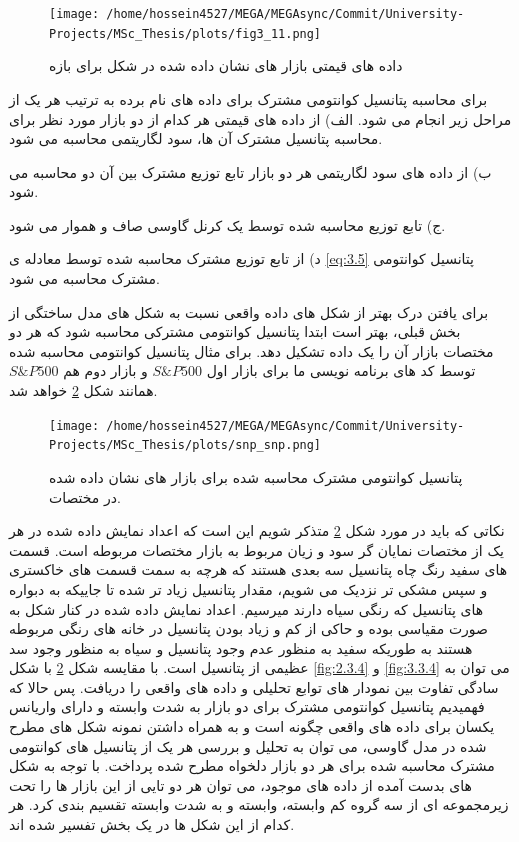 \documentclass[a4paper,titlepage,12pt,fleqn,oneside]{report}
\begin{document}
	\begin{figure}[ptb]
		\centering
		\texttt{[image: /home/hossein4527/MEGA/MEGAsync/Commit/University-Projects/MSc\_Thesis/plots/fig3\_11.png]}
		\caption{داده های قیمتی بازار های نشان داده شده در شکل برای بازه}
		\label{fig:11}
	\end{figure}
	برای محاسبه پتانسیل کوانتومی مشترک برای داده های نام برده به ترتیب هر یک از مراحل زیر انجام می شود. 
	الف) از داده های قیمتی هر کدام از دو بازار مورد نظر برای محاسبه پتانسیل مشترک آن ها، سود لگاریتمی محاسبه می شود.
	
	ب) از داده های سود لگاریتمی هر دو بازار تابع توزیع مشترک بین آن دو محاسبه می شود. 
	
	ج) تابع توزیع محاسبه شده توسط یک کرنل گاوسی صاف و هموار می شود.
	
	د) از تابع توزیع مشترک محاسبه شده توسط معادله ی 
	\ref{eq:3.5}
	پتانسیل کوانتومی مشترک محاسبه می شود. 
	
	برای یافتن درک بهتر از شکل های داده واقعی نسبت به شکل های مدل ساختگی از بخش قبلی، بهتر است ابتدا پتانسیل کوانتومی مشترکی محاسبه شود که هر دو مختصات بازار آن را یک داده تشکیل دهد. برای مثال پتانسیل کوانتومی محاسبه شده توسط کد های برنامه نویسی ما برای بازار اول
	$S\&P500$
	و بازار دوم هم
	$S\&P500$
	همانند شکل 
	\ref{fig:12}
	خواهد شد.
	\begin{figure}[ptb]
		\centering
		\texttt{[image: /home/hossein4527/MEGA/MEGAsync/Commit/University-Projects/MSc\_Thesis/plots/snp\_snp.png]}
		\caption{پتانسیل کوانتومی مشترک محاسبه شده برای بازار های نشان داده شده در مختصات.}
		\label{fig:12}
	\end{figure}
	نکاتی که باید در مورد شکل 
	\ref{fig:12}
	متذکر شویم این است که اعداد نمایش داده شده در هر یک از مختصات نمایان گر سود و زیان مربوط به بازار مختصات مربوطه است. قسمت های سفید رنگ چاه پتانسیل سه بعدی هستند که هرچه به سمت قسمت های خاکستری و سپس مشکی تر نزدیک می شویم، مقدار پتانسیل زیاد تر شده تا جاییکه به دبواره های پتانسیل که رنگی سیاه دارند میرسیم. اعداد نمایش داده شده در کنار شکل به صورت مقیاسی بوده و حاکی از کم و زیاد بودن پتانسیل در خانه های رنگی مربوطه هستند به طوریکه سفید به منظور عدم وجود پتانسیل و سیاه به منظور وجود سد عظیمی از پتانسیل است. 
	با مقایسه شکل 
	\ref*{fig:12}
	با شکل
	\ref{fig:2.3.4} 
	و 
	\ref{fig:3.3.4}
	می توان به سادگی تفاوت بین نمودار های توابع تحلیلی و داده های واقعی را دریافت.
	پس حالا که فهمیدیم پتانسیل کوانتومی مشترک برای دو بازار به شدت وابسته و دارای واریانس یکسان برای داده های واقعی چگونه است و به همراه داشتن نمونه شکل های مطرح شده در مدل گاوسی، می توان به تحلیل و بررسی هر یک از پتانسیل های کوانتومی مشترک محاسبه شده برای هر دو بازار دلخواه مطرح شده پرداخت.
	با توجه به شکل های بدست آمده از داده های موجود، می توان هر دو تایی از این بازار ها را تحت زیرمجموعه ای از سه گروه کم وابسته، وابسته و به شدت وابسته تقسیم بندی کرد. 
	هر کدام از این شکل ها در یک بخش تفسیر شده اند.
	
\end{document}
